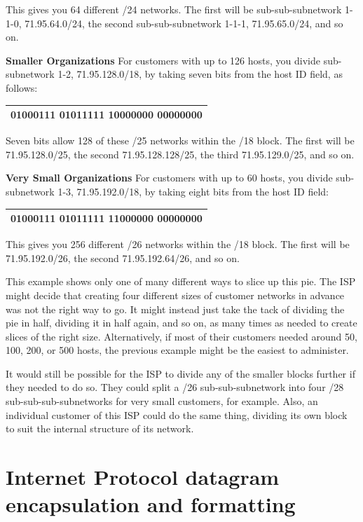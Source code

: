 \documentclass[b5paper,11pt]{memoir}
\begin{document}
This gives you 64 different /24 networks. The first will be
sub-sub-subnetwork 1-1-0, 71.95.64.0/24, the second sub-sub-subnetwork
1-1-1, 71.95.65.0/24, and so on.

{\textbf{Smaller Organizations}} For customers with up to 126 hosts, you
divide sub-subnetwork 1-2, 71.95.128.0/18, by taking seven bits from the
host ID field, as follows:

\begin{longtable}[]{@{}l@{}}
\toprule
\endhead
01000111 0101111{\textbf{1}} {\textbf{{10}}}{{000000
0}}0000000\tabularnewline
\bottomrule
\end{longtable}

Seven bits allow 128 of these /25 networks within the /18 block. The
first will be 71.95.128.0/25, the second 71.95.128.128/25, the third
71.95.129.0/25, and so on.

{\textbf{Very Small Organizations}} For customers with up to 60 hosts,
you divide sub-subnetwork 1-3, 71.95.192.0/18, by taking eight bits from
the host ID field:

\begin{longtable}[]{@{}l@{}}
\toprule
\endhead
01000111 0101111{\textbf{1 {11}}}{{000000}} {{00}}000000\tabularnewline
\bottomrule
\end{longtable}

This gives you 256 different /26 networks within the /18 block. The
first will be 71.95.192.0/26, the second 71.95.192.64/26, and so on.

This example shows only one of many different ways to slice up this pie.
The ISP might decide that creating four different sizes of customer
networks in advance was not the right way to go. It might instead just
take the tack of dividing the pie in half, dividing it in half again,
and so on, as many times as needed to create slices of the right size.
Alternatively, if most of their customers needed around 50, 100, 200, or
500 hosts, the previous example might be the easiest to administer.

It would still be possible for the ISP to divide any of the smaller
blocks further if they needed to do so. They could split a /26
sub-sub-subnetwork into four /28 sub-sub-sub-subnetworks for very small
customers, for example. Also, an individual customer of this ISP could
do the same thing, dividing its own block to suit the internal structure
of its network.



\chapter{Internet Protocol datagram encapsulation and formatting}
\label{chap:kozierok-ch21}
\end{document}
